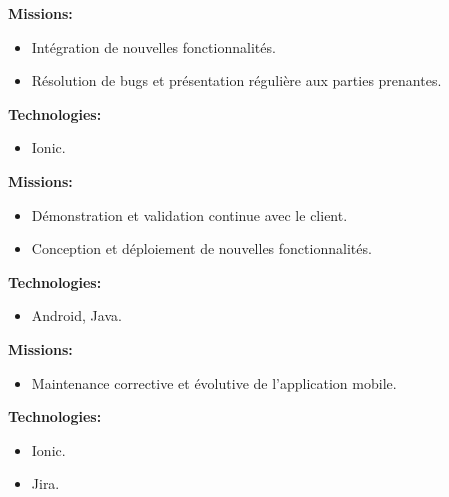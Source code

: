 \documentclass[10pt,a4paper,withhyper]{altacv}
\begin{document}
\begin{paracol}{2}
\textbf{Missions:}

\begin{itemize}
	\addtolength{\itemindent}{0.1cm}
	\item Intégration de nouvelles fonctionnalités.
	\item Résolution de bugs et présentation régulière aux parties prenantes.
\end{itemize}

\textbf{Technologies:}	
\begin{itemize}
	\addtolength{\itemindent}{0.1cm}
	\item Ionic.
	
\end{itemize}
\divider


\textbf{Missions:}

\begin{itemize}
	\addtolength{\itemindent}{0.1cm}
	\item Démonstration et validation continue avec le client.
	\item Conception et déploiement de nouvelles fonctionnalités.
\end{itemize}

	\textbf{Technologies:}	
\begin{itemize}
	\addtolength{\itemindent}{0.1cm}
	\item Android, Java.
	
\end{itemize}

\divider


\textbf{Missions:}

\begin{itemize}
	\addtolength{\itemindent}{0.1cm}
	\item Maintenance corrective et évolutive de l’application mobile.
\end{itemize}
	\textbf{Technologies:}	
\begin{itemize}
	\addtolength{\itemindent}{0.1cm}
	\item Ionic.
	\item Jira.
\end{itemize}



\end{paracol}
\end{document}
